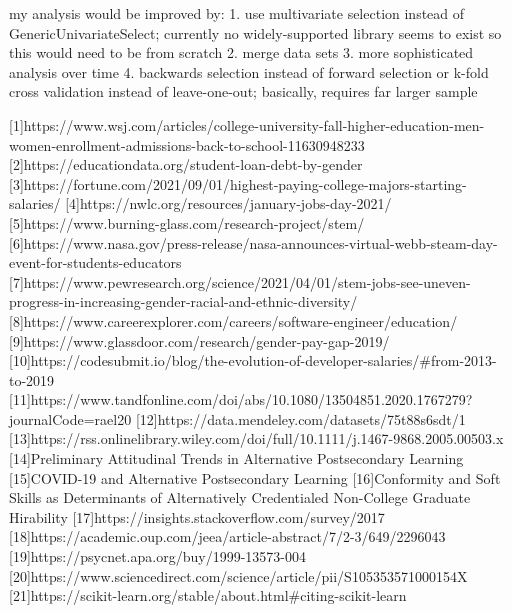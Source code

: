 \documentclass[review]{elsarticle}
\begin{document}
my analysis would be improved by:
  1. use multivariate selection instead of GenericUnivariateSelect; currently no widely-supported library seems to exist so this would need to be from scratch
  2. merge data sets
  3. more sophisticated analysis over time
  4. backwards selection instead of forward selection or k-fold cross validation instead of leave-one-out; basically, requires far larger sample




[1]https://www.wsj.com/articles/college-university-fall-higher-education-men-women-enrollment-admissions-back-to-school-11630948233
[2]https://educationdata.org/student-loan-debt-by-gender
[3]https://fortune.com/2021/09/01/highest-paying-college-majors-starting-salaries/
[4]https://nwlc.org/resources/january-jobs-day-2021/
[5]https://www.burning-glass.com/research-project/stem/
[6]https://www.nasa.gov/press-release/nasa-announces-virtual-webb-steam-day-event-for-students-educators
[7]https://www.pewresearch.org/science/2021/04/01/stem-jobs-see-uneven-progress-in-increasing-gender-racial-and-ethnic-diversity/
[8]https://www.careerexplorer.com/careers/software-engineer/education/
[9]https://www.glassdoor.com/research/gender-pay-gap-2019/
[10]https://codesubmit.io/blog/the-evolution-of-developer-salaries/#from-2013-to-2019
[11]https://www.tandfonline.com/doi/abs/10.1080/13504851.2020.1767279?journalCode=rael20
[12]https://data.mendeley.com/datasets/75t88s6sdt/1
[13]https://rss.onlinelibrary.wiley.com/doi/full/10.1111/j.1467-9868.2005.00503.x
[14]Preliminary Attitudinal Trends in Alternative Postsecondary Learning
[15]COVID-19 and Alternative Postsecondary Learning
[16]Conformity and Soft Skills as Determinants of Alternatively Credentialed Non-College Graduate Hirability
[17]https://insights.stackoverflow.com/survey/2017
[18]https://academic.oup.com/jeea/article-abstract/7/2-3/649/2296043
[19]https://psycnet.apa.org/buy/1999-13573-004
[20]https://www.sciencedirect.com/science/article/pii/S105353571000154X
[21]https://scikit-learn.org/stable/about.html#citing-scikit-learn
\end{document}
